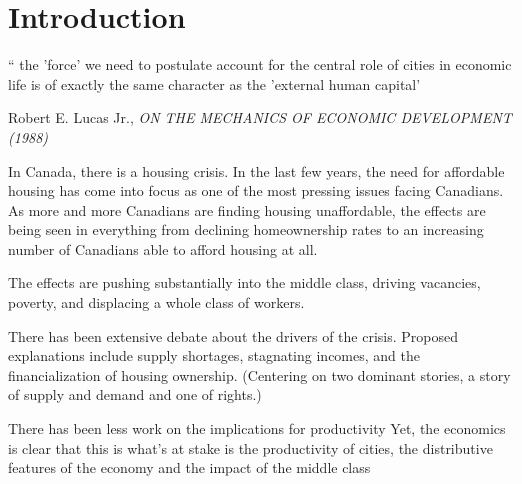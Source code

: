 \chapter{Introduction}

\epigraph{`` the 'force' we need to postulate account for the central role of cities in economic life is of exactly the same character as the 'external human capital'}{Robert E. Lucas Jr., \textit{ON THE MECHANICS OF ECONOMIC DEVELOPMENT (1988)}}

 

In Canada, there is a housing crisis. In the last few years, the need for affordable housing has come into focus as one of the most pressing issues facing Canadians. %
As more and more Canadians are finding housing unaffordable, the effects are being seen in everything from declining homeownership rates to an increasing number of Canadians able to afford housing at all.

The effects are pushing substantially into the middle class, driving vacancies, poverty, and displacing a whole class of workers. %

There has been extensive debate about the drivers of the crisis.  Proposed explanations include supply shortages, stagnating incomes, and the financialization of housing ownership.
(Centering on two dominant stories, a story of supply and demand and one of rights.) %

There has been less work on the implications for productivity %
Yet, the economics is clear that %
this is what's at stake is the productivity of cities, the distributive features of the economy and the impact of the middle class %

